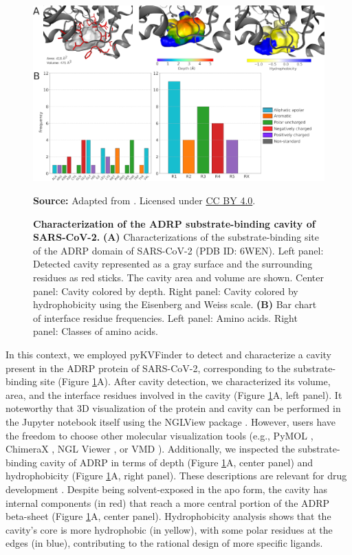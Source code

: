 \documentclass[Ingles]{phdthesis}
\def\eg{e.g.\onedot}
\begin{document}
\begin{figure}[h]
  \centering
  \includegraphics[scale=1.5]{images/adrp-sars-cov-2-analysis.png}
  \centerline{\tiny{\textbf{Source:} Adapted from \cite{guerra2021}. Licensed under \href{https://creativecommons.org/licenses/by/4.0/}{CC BY 4.0}.}}
  \caption[Characterization of the ADRP substrate-binding cavity of SARS-CoV-2]{\textbf{Characterization of the ADRP substrate-binding cavity of SARS-CoV-2.} \textbf{(A)} Characterizations of the substrate-binding site of the ADRP domain of SARS-CoV-2 (PDB ID: 6WEN). Left panel: Detected cavity represented as a gray surface and the surrounding residues as red sticks. The cavity area and volume are shown. Center panel: Cavity colored by depth. Right panel: Cavity colored by hydrophobicity using the Eisenberg and Weiss scale. \textbf{(B)} Bar chart of interface residue frequencies. Left panel: Amino acids. Right panel: Classes of amino acids.}
  \label{fig:binding-site-analysis}
\end{figure}

In this context, we employed pyKVFinder to detect and characterize a cavity present in the \acs{ADRP} protein of \acs{SARS-CoV-2}, corresponding to the substrate-binding site (Figure \ref{fig:binding-site-analysis}A). After cavity detection, we characterized its volume, area, and the interface residues involved in the cavity (Figure \ref{fig:binding-site-analysis}A, left panel). It noteworthy that 3D visualization of the protein and cavity can be performed in the Jupyter notebook itself using the NGLView package \cite{nglview}. However, users have the freedom to choose other molecular visualization tools (\eg, PyMOL \cite{pymol}, ChimeraX \cite{chimerax}, NGL Viewer \cite{nglviewer}, or VMD \cite{vmd}). Additionally, we inspected the substrate-binding cavity of ADRP in terms of depth (Figure \ref{fig:binding-site-analysis}A, center panel) and hydrophobicity (Figure \ref{fig:binding-site-analysis}A, right panel). These descriptions are relevant for drug development \cite{brosey2021}. Despite being solvent-exposed in the apo form, the cavity has internal components (in red) that reach a more central portion of the ADRP beta-sheet (Figure \ref{fig:binding-site-analysis}A, center panel). Hydrophobicity analysis shows that the cavity's core is more hydrophobic (in yellow), with some polar residues at the edges (in blue), contributing to the rational design of more specific ligands.
\end{document}

